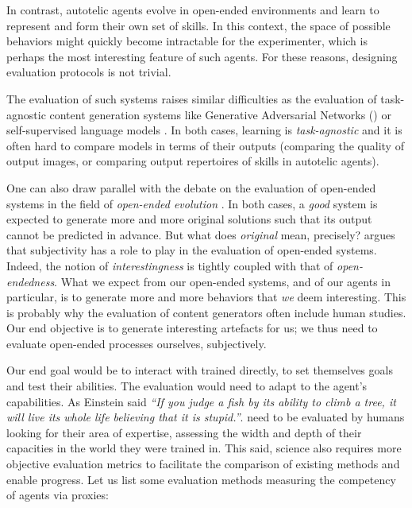 In contrast, autotelic agents evolve in open-ended environments and learn to represent and form their own set of skills. In this context, the space of possible behaviors might quickly become intractable for the experimenter, which is perhaps the most interesting feature of such agents. For these reasons, designing evaluation protocols is not trivial.

The evaluation of such systems raises similar difficulties as the evaluation of task-agnostic content generation systems like Generative Adversarial Networks (\gan) \cite{goodfellow2014generative} or self-supervised language models \cite{devlin2019bert,brown2020language}. In both cases, learning is \textit{task-agnostic} and it is often hard to compare models in terms of their outputs (\eg comparing the quality of \gan output images, or comparing output repertoires of skills in autotelic agents).

One can also draw parallel with the debate on the evaluation of open-ended systems in the field of \textit{open-ended evolution} \cite{hintze_open-endedness_2019,stanley_role_2016,stanley_why_2019}. In both cases, a \textit{good} system is expected to generate more and more original solutions such that its output cannot be predicted in advance. But what does \textit{original} mean, precisely? \cite{stanley_role_2016} argues that subjectivity has a role to play in the evaluation of open-ended systems. Indeed, the notion of \textit{interestingness} is tightly coupled with that of \textit{open-endedness}. What we expect from our open-ended systems, and of our \rlimgep agents in particular, is to generate more and more behaviors that \textit{we} deem interesting. This is probably why the evaluation of content generators often include human studies. Our end objective is to generate interesting artefacts for us; we thus need to evaluate open-ended processes ourselves, subjectively.

Our end goal would be to interact with trained \rlimgep directly, to set themselves goals and test their abilities. The evaluation would need to adapt to the agent's capabilities. As Einstein said \textit{``If you judge a fish by its ability to climb a tree, it will live its whole life believing that it is stupid.''}. \rlimgep need to be evaluated by humans looking for their area of expertise, assessing the width and depth of their capacities in the world they were trained in. This said, science also requires more objective evaluation metrics to facilitate the comparison of existing methods and enable progress. Let us list some evaluation methods measuring the competency of agents via proxies:

